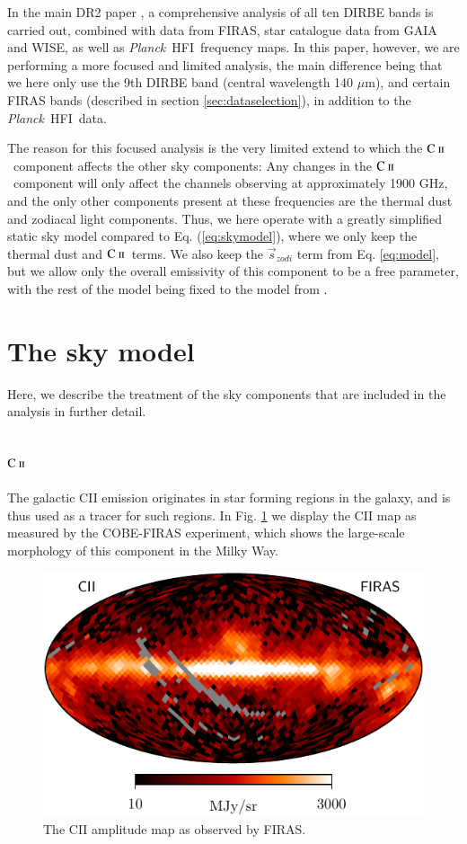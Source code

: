 \documentclass{aa}
\newcommand{\mathsc}[1]{{\normalfont\textsc{#1}}}
\def\Planck{\textit{Planck}}
\newcommand{\s}[0]{\vec{s}}
\newcommand{\cii}{\ensuremath{\mathsc {C\ ii}}}
\newcommand{\hfi}[0]{HFI}
\begin{document}
In the main DR2 paper \citep{CG02_01}, a comprehensive analysis of all ten
DIRBE bands is carried out, combined with data from FIRAS, star catalogue data
from GAIA and WISE, as well as \Planck\ \hfi\ frequency maps. In this paper,
however, we are performing a more focused and limited analysis, the main
difference being that we here only use the 9th DIRBE band (central wavelength
140 $\mu$m), and certain FIRAS bands (described in section
\ref{sec:dataselection}), in addition to the \Planck\ \hfi\ data.

The reason for this focused analysis is the very limited extend to which the
\cii\ component affects the other sky components: Any changes in the \cii\
component will only affect the channels observing at approximately 1900 GHz,
and the only other components present at these frequencies are the thermal dust
and zodiacal light components. Thus, we here operate with a greatly simplified
static sky model compared to Eq. (\ref{eq:skymodel}), where we only keep the
thermal dust and \cii\ terms. We also keep the $\s_{zodi}$ term from Eq.
\ref{eq:model}, but we allow only the overall emissivity of this component to
be a free parameter, with the rest of the model being fixed to the model from
\citet{CG02_02}.

\clearpage
\section{The sky model}
Here, we describe the treatment of the sky components that are included in the
analysis in further detail.

\label{sec:skymodel}
\subsection{\cii}
The galactic CII emission originates in star forming regions in the
galaxy, and is thus used as a tracer for such regions. In Fig.
\ref{fig:cii_firas} we display the CII map as measured by the COBE-FIRAS
experiment\citep{fixsen:1994,mather:1999}, which shows the large-scale
morphology of this component in the Milky Way.

\begin{figure}
    \centering
    \includegraphics[width=\columnwidth]{figures/init_CII_firas_n16_v20.pdf}
    \caption{The CII amplitude map as observed by FIRAS.}
    \label{fig:cii_firas}
\end{figure}
\end{document}
